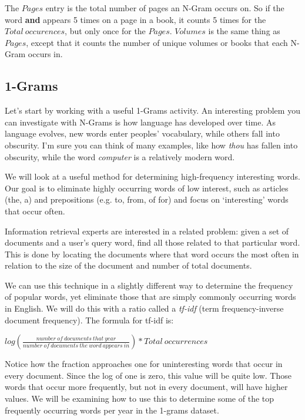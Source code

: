 \documentclass[letterpaper,10pt,openany,oneside]{sphinxmanual}
\begin{document}
The $Pages$ entry is the total number of pages an N-Gram
occurs on. So if the word \textbf{and} appears 5 times on a page in a
book, it counts 5 times for the $Total \ occurences$, but
only once for the $Pages$. $Volumes$ is the same
thing as $Pages$, except that it counts the number of
unique volumes or books that each N-Gram occurs in.


\subsection{1-Grams}
\label{WmrActivities/WmrActivities:grams}
Let's start by working with a useful 1-Grams activity. An
interesting problem you can investigate with N-Grams is how
language has developed over time. As language evolves, new words
enter peoples' vocabulary, while others fall into obscurity. I'm
sure you can think of many examples, like how \emph{thou} has fallen
into obscurity, while the word \emph{computer} is a relatively modern
word.

We will look at a useful method for determining high-frequency
interesting words. Our goal is to eliminate highly occurring words
of low interest, such as articles (the, a) and prepositions (e.g.
to, from, of for) and focus on `interesting' words that occur
often.

Information retrieval experts are interested in a related problem:
given a set of documents and a user's query word, find all those
related to that particular word. This is done by locating the
documents where that word occurs the most often in relation to the
size of the document and number of total documents.

We can use this technique in a slightly different way to determine
the frequency of popular words, yet eliminate those that are simply
commonly occurring words in English. We will do this with a ratio
called a \emph{tf-idf} (term frequency-inverse document frequency). The
formula for tf-idf is:

$log\left( \frac{number \ of \ documents \ that \ year}{number \ of \ documents \ the \ word \ appears \ in} \right) * Total \ occurrences$

Notice how the fraction approaches one for uninteresting words that
occur in every document. Since the log of one is zero, this value
will be quite low. Those words that occur more frequently, but not
in every document, will have higher values. We will be examining
how to use this to determine some of the top frequently occurring
words per year in the 1-grams dataset.
\end{document}
